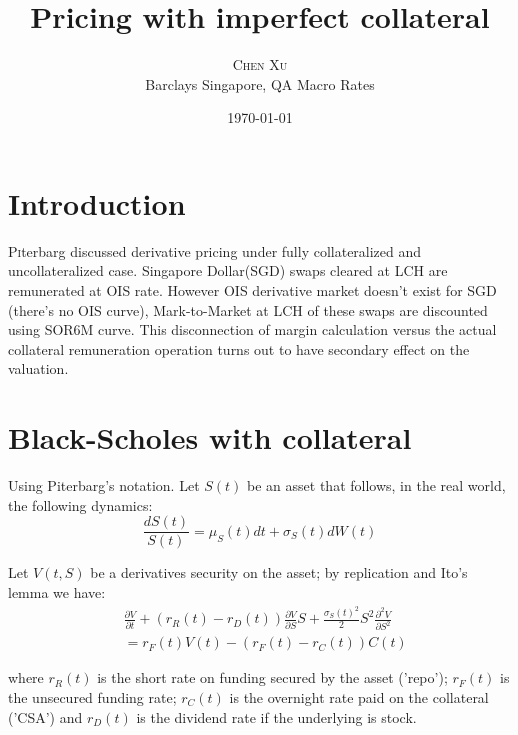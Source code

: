\documentclass[twoside,twocolumn]{article}
\title{Pricing with imperfect collateral} %
\author{%
\textsc{Chen Xu} \\%
\normalsize Barclays Singapore, QA Macro Rates \\ %
\normalsize %
}
\date{\today} %
\begin{document}
\maketitle


\section{Introduction}

\lettrine[nindent=0em,lines=3]{P} iterbarg\cite{Piterbarg:2010} discussed derivative pricing under fully collateralized and uncollateralized case. Singapore Dollar(SGD) swaps cleared at LCH are remunerated at OIS rate. However OIS derivative market doesn't exist for SGD (there's no OIS curve), Mark-to-Market at LCH of these swaps are discounted using SOR6M curve. This disconnection of margin calculation versus the actual collateral remuneration operation turns out to have secondary effect on the valuation. 




\section{Black-Scholes with collateral}

Using Piterbarg\cite{Piterbarg:2010}'s notation. Let $S(t)$ be an asset that follows, in the real world, the following dynamics:
\begin{equation}
\frac{dS(t)}{S(t)}= \mu_{S}(t)dt+\sigma_{S}(t)dW(t) \nonumber
\end{equation}

Let $V(t, S)$ be a derivatives security on the asset; by replication and Ito's lemma we have:
\begin{align*}
&\frac{\partial V}{\partial t} + (r_{R}(t)-r_{D}(t))\frac{\partial V}{\partial S}S + \frac{\sigma_{S}(t)^2}{2}S^2\frac{\partial^2 V}{\partial S^2}\\
&= r_{F}(t)V(t) - (r_{F}(t) - r_{C}(t))C(t)
\end{align*}

where $r_{R}(t)$ is the short rate on funding secured by the asset ('repo'); $r_{F}(t)$ is the unsecured funding rate; $r_{C}(t)$ is the overnight rate paid on the collateral ('CSA') and $r_{D}(t)$ is the dividend rate if the underlying is stock.
\end{document}
